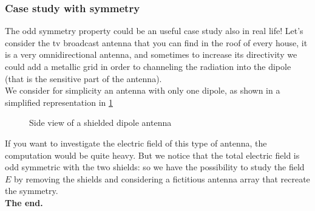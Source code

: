 \subsubsection*{Case study with symmetry}
The odd symmetry property could be an useful case study also in real life!
Let's consider the tv broadcast antenna that you can find in the roof of every house, it is a very omnidirectional antenna, and sometimes to increase its directivity we could add a metallic grid in order to channeling the radiation into the dipole (that is the sensitive part of the antenna).\\
We consider for simplicity an antenna with only one dipole, as shown in a simplified representation in \cref{fig:shielded_dipole}
\begin{figure}[H]
    \begin{center}
    \end{center}\caption{Side view of a shielded dipole antenna}\label{fig:shielded_dipole}
\end{figure}
If you want to investigate the electric field of this type of antenna, the computation would be quite heavy. But we notice that the total electric field is odd symmetric with the two shields: so we have the possibility to study the field $E$ by removing the shields and considering a fictitious antenna array that recreate the symmetry.\\
\textbf{The end.} 